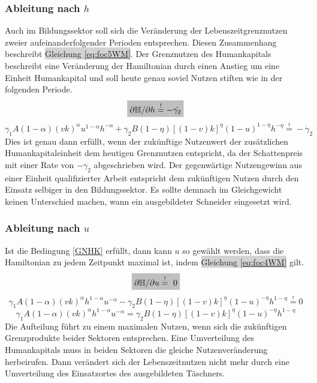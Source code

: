\subsubsection*{Ableitung nach $h$}
Auch im Bildungssektor soll sich die Veränderung der Lebenszeitgrenznutzen zweier aufeinanderfolgender Perioden entsprechen. Diesen Zusammenhang beschreibt \colorbox{lightgray}{Gleichung \eqref{eq:foc5WM}}. Der Grenznutzen des Humankapitals beschreibt eine Veränderung der Hamiltonian durch einen Anstieg um eine Einheit Humankapital und soll heute genau soviel Nutzen stiften wie in der folgenden Periode.
%
\begin{equation}
	\colorbox{lightgray}{$\partial\mathbb{H}/\partial h\overset{!}{=}-\dot{\gamma_2}$}\label{nachH}
\end{equation}
%
\begin{equation}
	\gamma_1A(1-\alpha)(vk)^\alpha u^{1-\alpha}h^{-\alpha}+\gamma_2 B(1-\eta)[(1-v)k]^{\eta}(1-u)^{1-\eta}h^{-\eta}\overset{!}{=}-\dot{\gamma}_2\label{GNHK}
\end{equation}
%
Dies ist genau dann erfüllt, wenn der zukünftige Nutzenwert der zusätzlichen Humankapitaleinheit dem heutigen Grenznutzen entspricht, da der Schattenpreis mit einer Rate von $-\gamma_2$ abgeschrieben wird. Der gegenwärtige Nutzengewinn aus einer Einheit qualifizierter Arbeit entspricht dem zukünftigen Nutzen durch den Einsatz selbiger in den Bildungssektor. Es sollte demnach im Gleichgewicht keinen Unterschied machen, wann ein ausgebildeter Schneider eingesetzt wird. 
%
\subsubsection*{Ableitung nach $u$}
Ist die Bedingung \eqref{GNHK} erfüllt, dann kann $u$ so gewählt werden, dass die Hamiltonian zu jedem Zeitpunkt maximal ist, indem \colorbox{lightgray}{Gleichung \eqref{eq:foc4WM}} gilt.
%
\begin{equation}
	\colorbox{lightgray}{$\partial\mathbb{H}/\partial u\overset{!}{=}~0$}
\end{equation}
%
\vspace{-0.5cm}
%
\begin{equation}
	\gamma_1A(1-\alpha)(vk)^{\alpha}h^{1-\alpha}u^{-\alpha}-\gamma_2B(1-\eta)[(1-v)k]^\eta (1-u)^{-\eta} h^{1-\eta}\overset{!}{=}0
\end{equation}
%
\vspace{-0.7cm}
%
\begin{equation}
	\gamma_1A(1-\alpha)(vk)^{\alpha}h^{1-\alpha}u^{-\alpha}=\gamma_2B(1-\eta)[(1-v)k]^\eta (1-u)^{-\eta} h^{1-\eta}\label{foc4}
\end{equation}
%
Die Aufteilung führt zu einem maximalen Nutzen, wenn sich die zukünftigen Grenzprodukte beider Sektoren entsprechen. Eine Umverteilung des Humankapitals muss in beiden Sektoren die gleiche Nutzenveränderung herbeirufen. Dann verändert sich der Lebenszeitnutzen nicht mehr durch eine Umverteilung des Einsatzortes des ausgebildeten Täschners.
%
